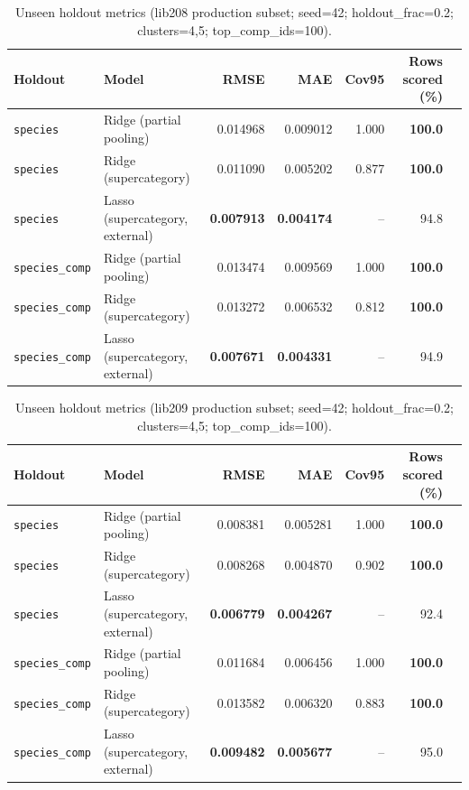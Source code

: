 \documentclass[11pt]{article}
\begin{document}
\begin{table}[H]
\centering
\caption{Unseen holdout metrics (lib208 production subset; seed=42; holdout\_frac=0.2; clusters=4,5; top\_comp\_ids=100).}
\label{tab:unseen_holdout_lib208}
\begin{tabular}{llrrrrr}
\toprule
Holdout & Model & RMSE & MAE & Cov95 & Rows scored (\%) \\
\midrule
\texttt{species} & Ridge (partial pooling) & 0.014968 & 0.009012 & 1.000 & \textbf{100.0} \\
\texttt{species} & Ridge (supercategory) & 0.011090 & 0.005202 & 0.877 & \textbf{100.0} \\
\texttt{species} & Lasso (supercategory, external) & \textbf{0.007913} & \textbf{0.004174} & -- & 94.8 \\
\midrule
\texttt{species\_comp} & Ridge (partial pooling) & 0.013474 & 0.009569 & 1.000 & \textbf{100.0} \\
\texttt{species\_comp} & Ridge (supercategory) & 0.013272 & 0.006532 & 0.812 & \textbf{100.0} \\
\texttt{species\_comp} & Lasso (supercategory, external) & \textbf{0.007671} & \textbf{0.004331} & -- & 94.9 \\
\bottomrule
\end{tabular}
\end{table}

\begin{table}[H]
\centering
\caption{Unseen holdout metrics (lib209 production subset; seed=42; holdout\_frac=0.2; clusters=4,5; top\_comp\_ids=100).}
\label{tab:unseen_holdout_lib209}
\begin{tabular}{llrrrrr}
\toprule
Holdout & Model & RMSE & MAE & Cov95 & Rows scored (\%) \\
\midrule
\texttt{species} & Ridge (partial pooling) & 0.008381 & 0.005281 & 1.000 & \textbf{100.0} \\
\texttt{species} & Ridge (supercategory) & 0.008268 & 0.004870 & 0.902 & \textbf{100.0} \\
\texttt{species} & Lasso (supercategory, external) & \textbf{0.006779} & \textbf{0.004267} & -- & 92.4 \\
\midrule
\texttt{species\_comp} & Ridge (partial pooling) & 0.011684 & 0.006456 & 1.000 & \textbf{100.0} \\
\texttt{species\_comp} & Ridge (supercategory) & 0.013582 & 0.006320 & 0.883 & \textbf{100.0} \\
\texttt{species\_comp} & Lasso (supercategory, external) & \textbf{0.009482} & \textbf{0.005677} & -- & 95.0 \\
\bottomrule
\end{tabular}
\end{table}
\end{document}
